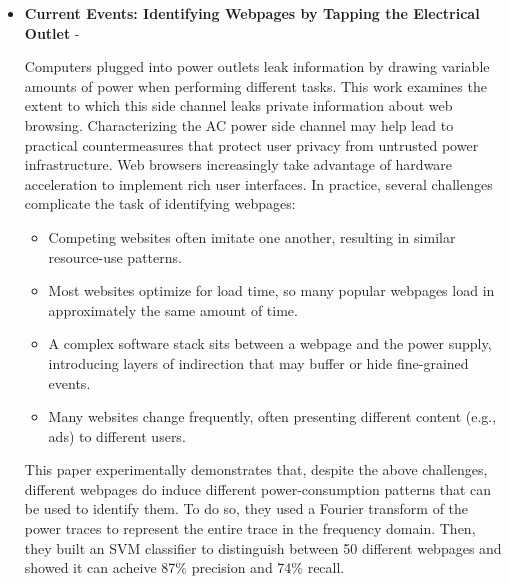 \begin{itemize}
    
    \item   \textbf{Current Events: Identifying Webpages by Tapping the Electrical Outlet}\cite{Identifying_Webpages} -\newline
    
    Computers plugged into power outlets leak information by drawing variable amounts of power when performing different tasks. 
    This work examines the extent to which this side channel leaks private information about web browsing.
    Characterizing the AC power side channel may help lead to practical countermeasures that protect user privacy from untrusted power infrastructure.
    Web browsers increasingly take advantage of hardware acceleration to implement rich user interfaces. In practice, several challenges complicate the task of identifying webpages:
    \begin{itemize}
        \item Competing websites often imitate one another, resulting in similar resource-use patterns.
        \item Most websites optimize for load time, so many popular webpages load in approximately the same amount of time.
        \item A complex software stack sits between a webpage and the power supply, introducing layers of indirection that may buffer or hide fine-grained events.
        \item Many websites change frequently, often presenting different content (e.g., ads) to different users.
      \end{itemize}

      This paper experimentally demonstrates that, despite the above challenges, 
      different webpages do induce different power-consumption patterns that can be used to 
      identify them.\newline 
      To do so, they used a Fourier transform of the power traces to represent
      the entire trace in the frequency domain.
      Then, they built an SVM classifier to distinguish between 50 different webpages and showed it 
      can acheive 87\% precision and 74\% recall.


    \end{itemize}